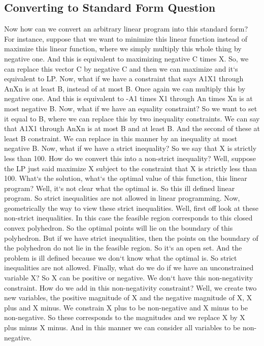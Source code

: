 \subsection{Converting to Standard Form Question}
Now how can we convert an arbitrary linear program into this standard form? For instance, suppose that we want to minimize this linear function instead of maximize this linear function, where we simply multiply this whole thing by negative one.
And this is equivalent to maximizing negative C times X\@.
So, we can replace this vector C by negative C and then we can maximize and it`s equivalent to LP\@.
Now, what if we have a constraint that says A1X1 through AnXn is at least B, instead of at most B\@.
Once again we can multiply this by negative one.
And this is equivalent to -A1 times X1 through An times Xn is at most negative B\@.
Now, what if we have an equality constraint? So we want to set it equal to B, where we can replace this by two inequality constraints.
We can say that A1X1 through AnXn is at most B and at least B\@.
And the second of these at least B constraint.
We can replace in this manner by an inequality at most negative B\@.
Now, what if we have a strict inequality? So we say that X is strictly less than 100.
How do we convert this into a non-strict inequality? Well, suppose the LP just said maximize X subject to the constraint that X is strictly less than 100.
What`s the solution, what`s the optimal value of this function, this linear program? Well, it`s not clear what the optimal is.
So this ill defined linear program.
So strict inequalities are not allowed in linear programming.
Now, geometrically the way to view these strict inequalities.
Well, first off look at these non-strict inequalities.
In this case the feasible region corresponds to this closed convex polyhedron.
So the optimal points will lie on the boundary of this polyhedron.
But if we have strict inequalities, then the points on the boundary of the polyhedron do not lie in the feasible region.
So it`s an open set.
And the problem is ill defined because we don`t know what the optimal is.
So strict inequalities are not allowed.
Finally, what do we do if we have an unconstrained variable X? So X can be positive or negative.
We don`t have this non-negativity constraint.
How do we add in this non-negativity constraint? Well, we create two new variables, the positive magnitude of X and the negative magnitude of X, X plus and X minus.
We constrain X plus to be non-negative and X minus to be non-negative.
So these corresponds to the magnitudes and we replace X by X plus minus X minus.
And in this manner we can consider all variables to be non-negative.

